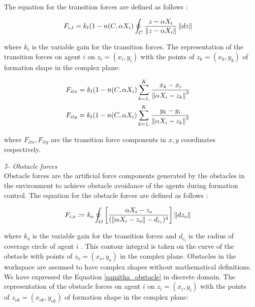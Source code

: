 The equation for the transition forces are defined as follows \cite{17}:	
				
\begin{equation}
F_{i,t} = k_t (1-n(C,\alpha X_i) \oint_C \frac{z-\alpha X_i}{\left\lVert z-\alpha X_i\right\rVert}\left\lVert dz\right\rVert
\end{equation}
				
where $k_t$ is the variable gain for the transition forces. The representation of the transition forces on agent $i$ on $z_i = (x_i, y_i)$ with the points of  $z_k = (x_k,y_k)$ of formation shape in the complex plane:
			
\begin{align}
\begin{split}
&F_{itx} = k_t  (1-n(C,\alpha X_i) \sum_{k=1,}^{K}\frac{x_k- x_i}{\left\lVert\alpha X_i - z_k\right\rVert^3}\\
&F_{ity} = k_t  (1-n(C,\alpha X_i) \sum_{k=1,}^{K}\frac{y_k- y_i}{\left\lVert\alpha X_i - z_k\right\rVert^3}\\
\end{split}
\end{align}
			
where  $F_{itx} , F_{ity} $ are the transition force components in $x,y$ coordinates respectively. \newline
			
\textit{			5- Obstacle forces} \\ 
Obstacle forces are the artificial force components generated by the obstacles in the environment to achieve obstacle avoidance of the agents during formation control. 	
The equation for the obstacle forces are defined as follows \cite{17}:	
			
\begin{equation} \label{samitha_obstacle}
F_{i,o} := k_o  \oint_O \left[\frac{\alpha X_i - z_o}{(\left\lVert\alpha X_i - z_o\right\rVert - d_{c_i})^4}\right] \left\lVert dz_o\right\rVert
\end{equation}
			
where $k_o$ is the variable gain for the transition forces and $d_{c_i}$ is the radius of coverage circle of agent $i$ . This contour integral is taken on the curve of the obstacle with  points of $z_o = (x_o,y_o)$ in the complex plane. Obstacles in the workspace are assumed to have complex shapes without mathematical definitions. We have expressed the Equation \ref{samitha_obstacle} in discrete domain. The representation of the obstacle forces on agent $i$ on $z_i = (x_i, y_i)$ with the points of  $z_{ok} = (x_{ok},y_{ok})$ of formation shape in the complex plane:
			
